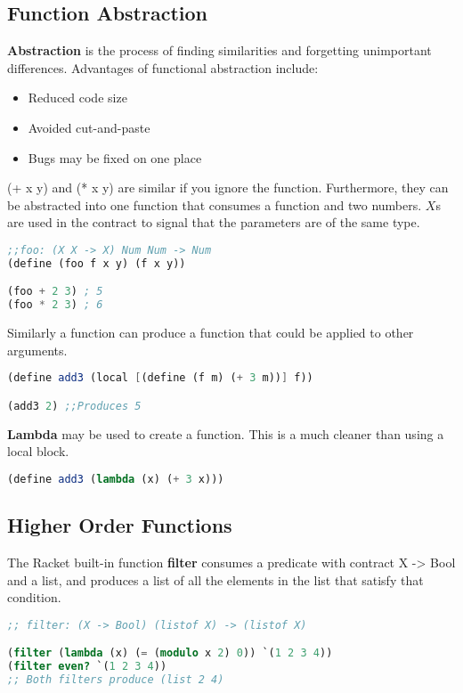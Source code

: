 \documentclass[english, 12pt]{article}
\begin{document}
\subsection{Function Abstraction}
\begin{defn}
\textbf{Abstraction} is the process of finding similarities and forgetting unimportant differences. Advantages of functional abstraction include:
\begin{itemize}
\item Reduced code size
\item Avoided cut-and-paste
\item Bugs may be fixed on one place
\end{itemize}
\end{defn}
\begin{exmp}
(+ x y) and (* x y) are similar if you ignore the function. Furthermore, they can be abstracted into one function that consumes a function and two numbers. $X$s are used in the contract to signal that the parameters are of the same type.
\begin{lstlisting}[language=Scheme]
;;foo: (X X -> X) Num Num -> Num
(define (foo f x y) (f x y))

(foo + 2 3) ; 5
(foo * 2 3) ; 6
\end{lstlisting}
\end{exmp}
\begin{exmp}
Similarly a function can produce a function that could be applied to other arguments.
\begin{lstlisting}[language=Scheme]
(define add3 (local [(define (f m) (+ 3 m))] f))

(add3 2) ;;Produces 5
\end{lstlisting}
\end{exmp}
\begin{defn}
\textbf{Lambda} may be used to create a function. This is a much cleaner than using a local block.
\begin{lstlisting}[language=Scheme]
(define add3 (lambda (x) (+ 3 x)))
\end{lstlisting}
\subsection{Higher Order Functions}
\end{defn}
\begin{defn}
The Racket built-in function \textbf{filter} consumes a predicate with contract X -> Bool and a list, and produces a list of all the elements in the list that satisfy that condition.
\begin{lstlisting}[language=Scheme]
;; filter: (X -> Bool) (listof X) -> (listof X)

(filter (lambda (x) (= (modulo x 2) 0)) `(1 2 3 4))
(filter even? `(1 2 3 4))
;; Both filters produce (list 2 4)
\end{lstlisting}
\end{defn}
\end{document}
